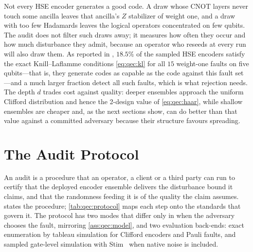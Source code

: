 Not every HSE encoder generates a good code. A draw whose CNOT layers never touch some ancilla leaves that ancilla's $Z$ stabilizer of weight one, and a draw with too few Hadamards leaves the logical operators concentrated on few qubits. The audit does not filter such draws away; it measures how often they occur and how much disturbance they admit, because an operator who reseeds at every run will also draw them. As reported in \cite{guo2026qecaudit}, $18.5\%$ of the sampled HSE encoders satisfy the exact Knill--Laflamme conditions \cref{eq:qec:kl} for all $15$ weight-one faults on five qubits---that is, they generate codes as capable as the  code against this fault set---and a much larger fraction detect all such faults, which is what rejection needs. The depth $d$ trades cost against quality: deeper ensembles approach the uniform Clifford distribution and hence the 2-design value of \cref{eq:qec:haar}, while shallow ensembles are cheaper and, as the next sections show, can do better than that value against a committed adversary because their structure favours spreading.

\section{The Audit Protocol}\label{sec:qec:protocol}

An audit is a procedure that an operator, a client or a third party can run to certify that the deployed encoder ensemble delivers the disturbance bound it claims, and that the randomness feeding it is of the quality the claim assumes.  states the procedure; \cref{tab:qec:protocol} maps each step onto the standards that govern it. The protocol has two modes that differ only in when the adversary chooses the fault, mirroring \cref{ass:qec:model}, and two evaluation back-ends: exact enumeration by tableau simulation for Clifford encoders and Pauli faults, and sampled gate-level simulation with Stim~\cite{gidney2021stim} when native noise is included.

